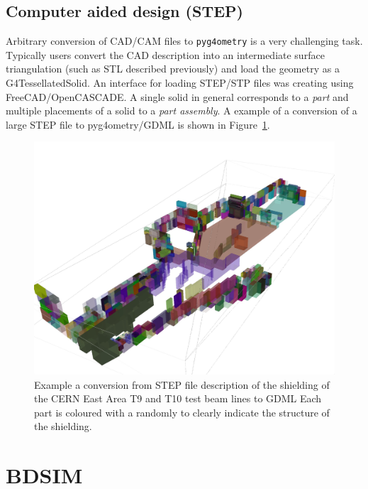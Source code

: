 \documentclass[a4paper,
               keeplastbox,   %
               ]{jacow}
\begin{document}
\subsection{Computer aided design (STEP)}
Arbitrary conversion of CAD/CAM files to \verb|pyg4ometry| is a very challenging task. Typically users convert the CAD description into
an intermediate surface triangulation (such as STL described previously) and load the geometry as a G4TessellatedSolid. An interface for
loading STEP/STP files was creating using FreeCAD/OpenCASCADE. A single solid in general corresponds to a {\it part} and multiple placements 
of a solid to a {\it part assembly}.
A example of a conversion of a large STEP file to pyg4ometry/GDML is shown in Figure~\ref{fig:ea910}.
\begin{figure}[!htb]
   \centering
   \includegraphics*[width=1.0\columnwidth]{./examples/ea9-10.jpg}
   \caption{Example a conversion from STEP file description of the shielding of the CERN East Area T9 and T10 test beam lines to GDML Each part is 
   coloured with a randomly to clearly indicate the structure of the shielding.}
   \label{fig:ea910}
\end{figure}


\section{BDSIM}
\end{document}
